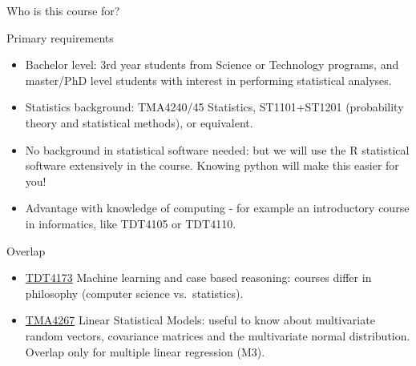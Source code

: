 \documentclass[
  10pt,
  ignorenonframetext,
]{beamer}
\providecommand{\tightlist}{%
  \setlength{\itemsep}{0pt}\setlength{\parskip}{0pt}}
\begin{document}
\begin{frame}{Who is this course for?}
\protect\hypertarget{who-is-this-course-for}{}
\begin{block}{Primary requirements}
\protect\hypertarget{primary-requirements}{}
\(~\)

\begin{itemize}
\tightlist
\item
  Bachelor level: 3rd year students from Science or Technology programs,
  and master/PhD level students with interest in performing statistical
  analyses.
\end{itemize}

\vspace{2mm}

\begin{itemize}
\tightlist
\item
  Statistics background: TMA4240/45 Statistics, ST1101+ST1201
  (probability theory and statistical methods), or equivalent.
\end{itemize}

\vspace{2mm}

\begin{itemize}
\tightlist
\item
  No background in statistical software needed: but we will use the R
  statistical software extensively in the course. Knowing python will
  make this easier for you!
\end{itemize}

\vspace{2mm}

\begin{itemize}
\tightlist
\item
  Advantage with knowledge of computing - for example an introductory
  course in informatics, like TDT4105 or TDT4110.
\end{itemize}
\end{block}
\end{frame}

\begin{frame}
\begin{block}{Overlap}
\protect\hypertarget{overlap}{}
\vspace{2mm}

\begin{itemize}
\tightlist
\item
  \href{https://www.ntnu.no/studier/emner/TDT4173\#tab=omEmnet}{TDT4173}
  Machine learning and case based reasoning: courses differ in
  philosophy (computer science vs.~statistics).
\end{itemize}

\vspace{2mm}

\begin{itemize}
\tightlist
\item
  \href{https://www.ntnu.no/studier/emner/TMA4267\#tab=omEmnet}{TMA4267}
  Linear Statistical Models: useful to know about multivariate random
  vectors, covariance matrices and the multivariate normal distribution.
  Overlap only for multiple linear regression (M3).
\end{itemize}
\end{block}
\end{frame}
\end{document}
